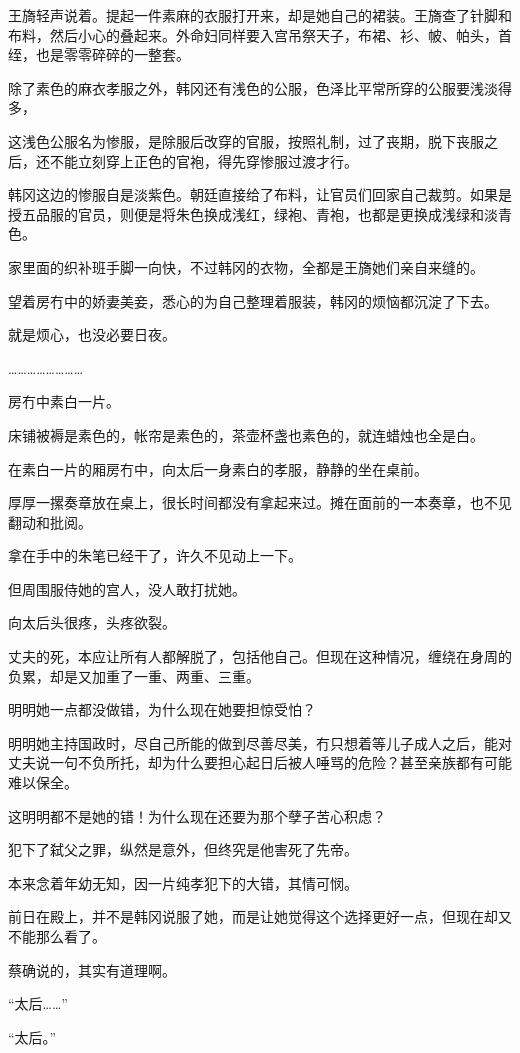 王旖轻声说着。提起一件素麻的衣服打开来，却是她自己的裙装。王旖查了针脚和布料，然后小心的叠起来。外命妇同样要入宫吊祭天子，布裙、衫、帔、帕头，首绖，也是零零碎碎的一整套。

除了素色的麻衣孝服之外，韩冈还有浅色的公服，色泽比平常所穿的公服要浅淡得多，

这浅色公服名为惨服，是除服后改穿的官服，按照礼制，过了丧期，脱下丧服之后，还不能立刻穿上正色的官袍，得先穿惨服过渡才行。

韩冈这边的惨服自是淡紫色。朝廷直接给了布料，让官员们回家自己裁剪。如果是授五品服的官员，则便是将朱色换成浅红，绿袍、青袍，也都是更换成浅绿和淡青色。

家里面的织补班手脚一向快，不过韩冈的衣物，全都是王旖她们亲自来缝的。

望着房冇中的娇妻美妾，悉心的为自己整理着服装，韩冈的烦恼都沉淀了下去。

就是烦心，也没必要日夜。

……………………

房冇中素白一片。

床铺被褥是素色的，帐帘是素色的，茶壶杯盏也素色的，就连蜡烛也全是白。

在素白一片的厢房冇中，向太后一身素白的孝服，静静的坐在桌前。

厚厚一摞奏章放在桌上，很长时间都没有拿起来过。摊在面前的一本奏章，也不见翻动和批阅。

拿在手中的朱笔已经干了，许久不见动上一下。

但周围服侍她的宫人，没人敢打扰她。

向太后头很疼，头疼欲裂。

丈夫的死，本应让所有人都解脱了，包括他自己。但现在这种情况，缠绕在身周的负累，却是又加重了一重、两重、三重。

明明她一点都没做错，为什么现在她要担惊受怕？

明明她主持国政时，尽自己所能的做到尽善尽美，冇只想着等儿子成人之后，能对丈夫说一句不负所托，却为什么要担心起日后被人唾骂的危险？甚至亲族都有可能难以保全。

这明明都不是她的错！为什么现在还要为那个孽子苦心积虑？

犯下了弑父之罪，纵然是意外，但终究是他害死了先帝。

本来念着年幼无知，因一片纯孝犯下的大错，其情可悯。

前日在殿上，并不是韩冈说服了她，而是让她觉得这个选择更好一点，但现在却又不能那么看了。

蔡确说的，其实有道理啊。

“太后……”

“太后。”


